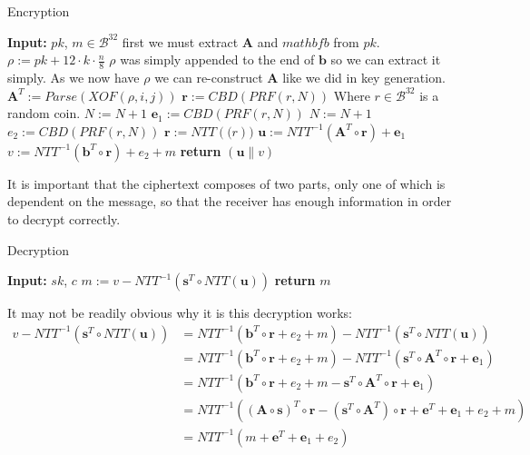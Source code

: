 \documentclass[a4paper, 10pt]{article}
\theoremstyle{definition}
\begin{document}
\begin{algorithm}[H]
    \caption{Encryption}
    \begin{algorithmic}
    \State \textbf{Input:} $pk$, $m \in \mathcal{B}^{32}$
    \State first we must extract $\mathbf{A}$ and $mathbf{b}$ from $pk$.
    \State $\rho:=pk+12\cdot k\cdot \frac{n}{8}$ \Comment $\rho$ was simply appended to the end of $\mathbf{b}$ so we can extract it simply. As we now have $\rho$ we can re-construct $\mathbf{A}$ like we did in key generation.
            \State $\mathbf{A}^T:=Parse(XOF(\rho , i, j))$ 
        \EndFor
    \EndFor
        \State $\mathbf{r}:=CBD(PRF(r ,N))$ \Comment Where $r \in \mathcal{B}^{32}$ is a random coin.
        \State $N:=N+1$
    \EndFor
        \State $\mathbf{e}_1:=CBD(PRF(r ,N))$
        \State $N:=N+1$
    \EndFor
    \State $e_2:=CBD(PRF(r, N))$
    \State $\mathbf{r}:=NTT(\mathbf(r))$
    \State $\mathbf{u}:=NTT^{-1}(\mathbf{A}^T\circ \mathbf{r})+\mathbf{e}_1$
    \State $v:=NTT^{-1}(\mathbf{b}^T\circ \mathbf{r})+e_2 + m $
    \State \textbf{return} $(\mathbf{u}\|v)$
    \end{algorithmic}
\end{algorithm}

It is important that the ciphertext composes of two parts, only one of which is dependent on the message, so that the receiver has enough information in order to decrypt correctly.

\begin{algorithm}[H]
    \caption{Decryption}
    \begin{algorithmic}
    \State \textbf{Input:} $sk$, $c$
    \State $m:=v-NTT^{-1}(\mathbf{s}^T\circ NTT(\mathbf{u}))$
    \State \textbf{return} $m$
    \end{algorithmic}
\end{algorithm}

It may not be readily obvious why it is this decryption works:
\begin{align*}
    v-NTT^{-1}(\mathbf{s}^T\circ NTT(\mathbf{u})) &= NTT^{-1}(\mathbf{b}^T\circ \mathbf{r}+e_2+m)-NTT^{-1}(\mathbf{s}^T\circ NTT(\mathbf{u}))\\
    &=NTT^{-1}(\mathbf{b}^T\circ \mathbf{r}+e_2+m)-NTT^{-1}(\mathbf{s}^T\circ \mathbf{A}^T\circ \mathbf{r}+\mathbf{e}_1)\\
    &=NTT^{-1}(\mathbf{b}^T\circ \mathbf{r}+e_2+m-\mathbf{s}^T\circ \mathbf{A}^T\circ \mathbf{r}+\mathbf{e}_1)\\
    &=NTT^{-1}(( \mathbf{A} \circ \mathbf{s})^T \circ \mathbf{r} - (\mathbf{s}^T \circ \mathbf{A} ^T) \circ \mathbf{r} + \mathbf{e} ^T + \mathbf{e}_1 + e_2 + m)\\
    &=NTT^{-1}(m+\mathbf{e}^T+\mathbf{e}_1+e_2)
\end{align*}
\end{document}
